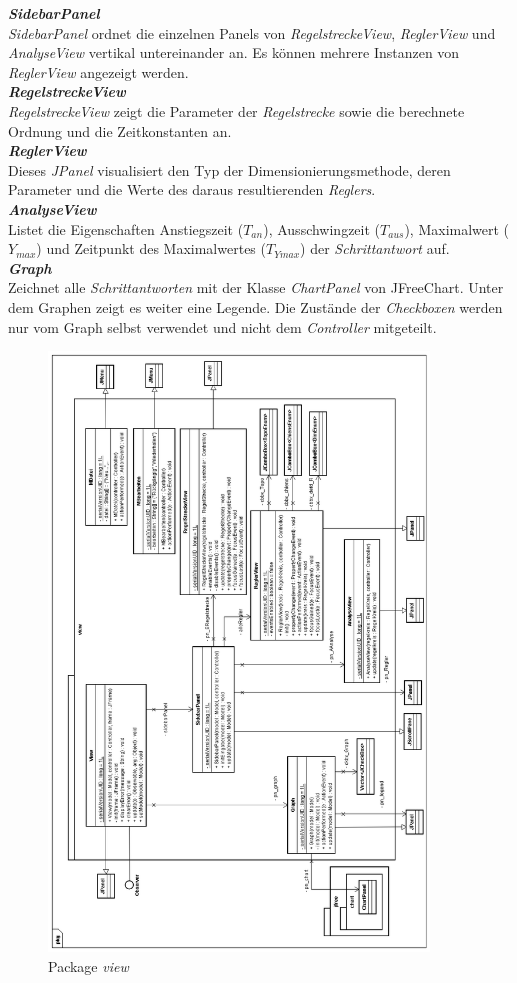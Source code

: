 \textit{\textbf{SidebarPanel}}\\
\textit{SidebarPanel} ordnet die einzelnen Panels von \textit{RegelstreckeView}, \textit{ReglerView} und \textit{AnalyseView} vertikal untereinander an. Es können mehrere Instanzen von \textit{ReglerView} angezeigt werden.\\

\textit{\textbf{RegelstreckeView}}\\
\textit{RegelstreckeView} zeigt die Parameter der \textit{Regelstrecke} sowie die berechnete Ordnung und die Zeitkonstanten an.\\

\textit{\textbf{ReglerView}}\\
Dieses \textit{JPanel} visualisiert den Typ der Dimensionierungsmethode, deren Parameter und die Werte des daraus resultierenden \textit{Reglers}.\\

\textit{\textbf{AnalyseView}}\\
Listet die Eigenschaften Anstiegszeit ($T_{an}$), Ausschwingzeit ($T_{aus}$), Maximalwert ($Y_{max}$) und Zeitpunkt des Maximalwertes ($T_{Ymax}$) der \textit{Schrittantwort} auf.\\

\textit{\textbf{Graph}}\\
Zeichnet alle \textit{Schrittantworten} mit der Klasse \textit{ChartPanel} von JFreeChart. Unter dem Graphen zeigt es weiter eine Legende. Die Zustände der \textit{Checkboxen} werden nur vom Graph selbst verwendet und nicht dem \textit{Controller} mitgeteilt.

\begin{figure}[p]
\centering
\includegraphics[width=0.9\textwidth]{packview.png}
\caption{Package \textit{view}}
\label{packview}
\end{figure}
